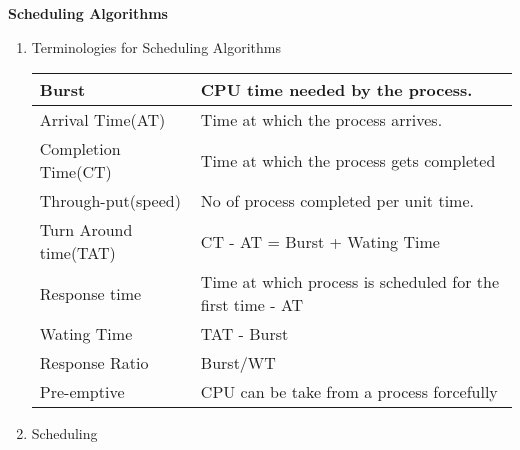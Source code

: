 
\centerline{\textbf{ \LARGE Scheduling Algorithms}}




\begin{enumerate}

  \item Terminologies for Scheduling Algorithms

  \begin{myTableStyle}
    \begin{tabular}{ |l|l| } \hline
        Burst                 &     CPU time needed by the process.                             \\ \hline
        Arrival Time(AT)      &     Time at which the process arrives.                          \\ \hline
        Completion Time(CT)   &     Time at which the process gets completed                    \\ \hline
        Through-put(speed)    &     No of process completed per unit time.                      \\ \hline
        Turn Around time(TAT) &     CT - AT   =  Burst + Wating Time                            \\ \hline
        Response time         &     Time at which process is scheduled for the first time - AT  \\ \hline
        Wating Time           &     TAT -  Burst                                                \\ \hline
        Response Ratio        &     Burst/WT                                                    \\ \hline
        Pre-emptive           &     CPU can be take from a process forcefully                   \\ \hline
    \end{tabular}
  \end{myTableStyle}

  \vspace{0.08in}

  \item Scheduling


\end{enumerate}
